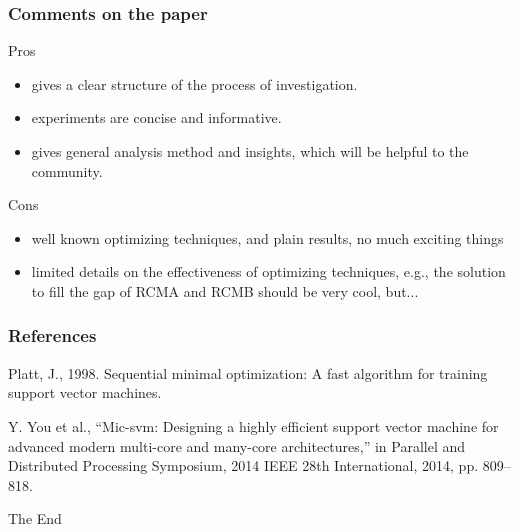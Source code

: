 \documentclass{beamer}
\begin{document}
\begin{frame}
	\frametitle{Comments on the paper}
	\begin{block}{Pros}
		\begin{itemize}
			\item gives a clear structure of the process of investigation.
			\item experiments are concise and informative. 
			\item gives general analysis method and insights, which will be helpful to the community. 
		\end{itemize}		
	\end{block}
	\begin{block}{Cons}
		\begin{itemize}
			\item well known optimizing techniques, and plain results, no much exciting things
			\item limited details on the effectiveness of optimizing techniques, e.g., the solution to fill the gap of RCMA and RCMB should be very cool, but...			
		\end{itemize}		
	\end{block}
\end{frame}


\begin{frame}
\frametitle{References}
\footnotesize{
\begin{thebibliography}{99} %

 Platt, J., 1998. Sequential minimal optimization: A fast algorithm for training support vector machines.

 Y. You et al., “Mic-svm: Designing a highly efficient support vector machine for advanced modern multi-core and many-core architectures,” in Parallel and Distributed Processing Symposium, 2014 IEEE 28th International, 2014, pp. 809–818.

\end{thebibliography}
}
\end{frame}




\begin{frame}
\Huge{\centerline{The End}}
\end{frame}

\end{document}
